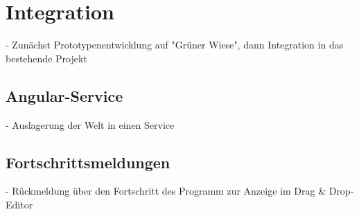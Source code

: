 \section{Integration}

- Zunächst Prototypenentwicklung auf "Grüner Wiese", dann Integration in das
  bestehende Projekt

\subsection{Angular-Service}

- Auslagerung der Welt in einen Service

\subsection{Fortschrittsmeldungen}

- Rückmeldung über den Fortschritt des Programm zur Anzeige im Drag \& Drop-Editor
